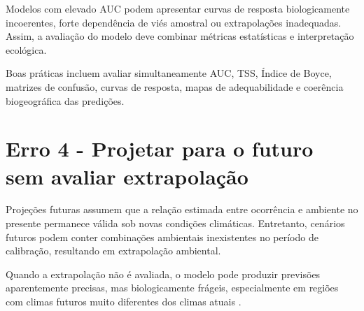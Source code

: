 Modelos com elevado AUC podem apresentar curvas de resposta biologicamente
incoerentes, forte dependência de viés amostral ou extrapolações inadequadas.
Assim, a avaliação do modelo deve combinar métricas estatísticas e interpretação
ecológica.

\begin{center}
\end{center}

Boas práticas incluem avaliar simultaneamente AUC, TSS, Índice de Boyce,
matrizes de confusão, curvas de resposta, mapas de adequabilidade e coerência
biogeográfica das predições.

\section{Erro 4 - Projetar para o futuro sem avaliar extrapolação}

Projeções futuras assumem que a relação estimada entre ocorrência e ambiente
no presente permanece válida sob novas condições climáticas. Entretanto,
cenários futuros podem conter combinações ambientais inexistentes no período de
calibração, resultando em extrapolação ambiental.

Quando a extrapolação não é avaliada, o modelo pode produzir previsões
aparentemente precisas, mas biologicamente frágeis, especialmente em regiões
com climas futuros muito diferentes dos climas atuais
\citep{elith2010functional, owens2013constraints, zurell2020standard}.

\begin{center}
\end{center}


